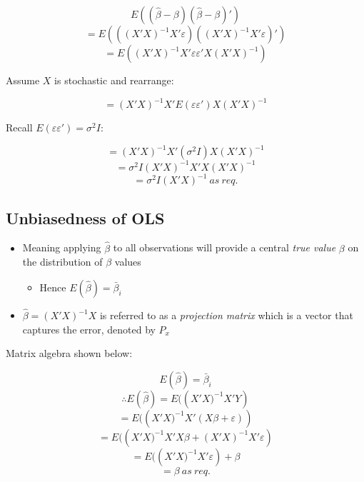 \documentclass[11pt, english]{article}
\begin{document}
	$$E\left((\hat{\beta}-\beta)(\hat{\beta}-\beta)'\right)$$
	$$=E\left(((X'X)^{-1}X'\varepsilon)((X'X)^{-1}X'\varepsilon)'\right)$$
	$$=E\left((X'X)^{-1}X'\varepsilon\varepsilon'X(X'X)^{-1}\right)$$

	Assume $X$ is stochastic and rearrange:

	$$=(X'X)^{-1}X'E(\varepsilon\varepsilon')X(X'X)^{-1}$$

	Recall $E(\varepsilon\varepsilon')=\sigma^2I$:

	$$=(X'X)^{-1}X'(\sigma^2I)X(X'X)^{-1}$$
	$$=\sigma^2I(X'X)^{-1}X'X(X'X)^{-1}$$
	$$=\sigma^2I(X'X)^{-1}\ as\ req.$$
	
	\newpage

	\subsection{Unbiasedness of OLS}

	\begin{itemize}
	\setlength\itemsep{0cm}
		\item Meaning applying $\hat{\beta}$ to all observations will provide a central \textit{true value} $\beta$ on the distribution of $\beta$ values
		\begin{itemize}
			\item Hence $E(\hat{\beta})=\bar{\beta}_i$
		\end{itemize}
		\item $\hat{\beta}=(X'X)^{-1}X$ is referred to as a \textit{projection matrix} which is a vector that captures the error, denoted by $P_x$
	\end{itemize}

	Matrix algebra shown below:

	$$E(\hat{\beta})=\bar{\beta}_i$$
	$$\therefore E(\hat{\beta})=E(\left(X'X)^{-1}X'Y\right)$$
	$$=E(\left(X'X)^{-1}X'(X\beta+\varepsilon)\right)$$
	$$=E(\left(X'X)^{-1}X'X\beta+(X'X)^{-1}X'\varepsilon\right)$$
	$$=E(\left(X'X)^{-1}X'\varepsilon\right)+\beta$$
	$$=\beta\ as\ req.$$
\end{document}
